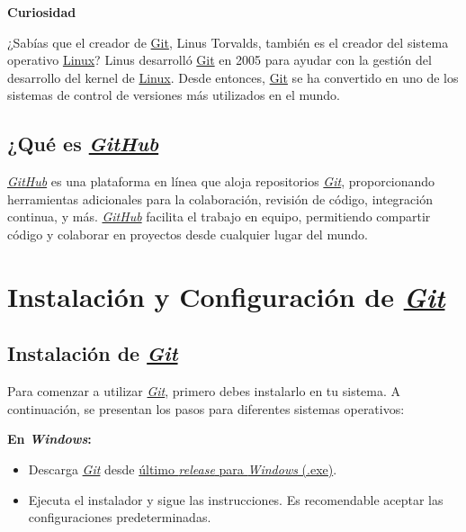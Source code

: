 \documentclass{template/uem_theme}
\begin{document}
\begin{uemBulbBox}{
	\textbf{Curiosidad}
 
	¿Sabías que el creador de \href{https://git-scm.com/}{Git}, Linus Torvalds, también es el creador del sistema operativo \href{https://www.kernel.org/}{Linux}? Linus desarrolló \href{https://git-scm.com/}{Git} en 2005 para ayudar con la gestión del desarrollo del kernel de \href{https://www.kernel.org/}{Linux}. Desde entonces, \href{https://git-scm.com/}{Git} se ha convertido en uno de los sistemas de control de versiones más utilizados en el mundo.

}\end{uemBulbBox}

\subsection{¿Qué es \href{https://github.com}{\textit{GitHub}}}
\href{https://github.com}{\textit{GitHub}} es una plataforma en línea que aloja repositorios \href{https://git-scm.com/}{\textit{Git}}, proporcionando herramientas adicionales para la colaboración, revisión de código, integración continua, y más. \href{https://github.com}{\textit{GitHub}} facilita el trabajo en equipo, permitiendo compartir código y colaborar en proyectos desde cualquier lugar del mundo.

\newpage
\section{Instalación y Configuración de \href{https://git-scm.com/}{\textit{Git}}}
\subsection{Instalación de \href{https://git-scm.com/}{\textit{Git}}}
Para comenzar a utilizar \href{https://git-scm.com/}{\textit{Git}}, primero debes instalarlo en tu sistema. A continuación, se presentan los pasos para diferentes sistemas operativos:
\vspace{0.5cm}

\begin{uemClipBox}{
    \textbf{En \textit{Windows}:}
    \begin{itemize}
        \item Descarga \href{https://git-scm.com/}{\textit{Git}} desde \href{https://github.com/git-for-windows/git/releases/download/v2.46.0.windows.1/Git-2.46.0-64-bit.exe}{último \textit{release} para \textit{Windows} (.exe)}.
        \item Ejecuta el instalador y sigue las instrucciones. Es recomendable aceptar las configuraciones predeterminadas.
    \end{itemize}
}\end{uemClipBox}
\end{document}

